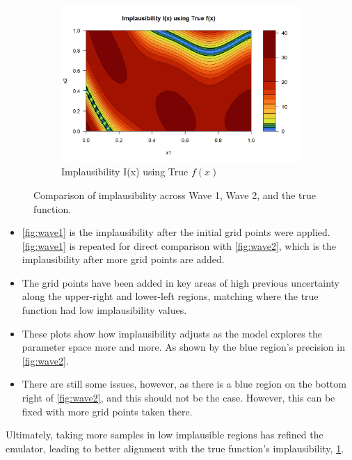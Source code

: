 \documentclass[12pt]{report} %
\begin{document}
\begin{figure}[H]
    \begin{subfigure}{0.6\textwidth}
        \centering
        \includegraphics[width=\linewidth]{Wave Implausibility I(x) using True f(x).png}
        \caption{Implausibility I(x) using True $f(x)$}
        \label{fig:true_implausibility}
    \end{subfigure}
    
    \caption{Comparison of implausibility across Wave 1, Wave 2, and the true function.}
    \label{fig:implausibility_comparison}
\end{figure}

\begin{itemize}
    \item \ref{fig:wave1} is the implausibility after the initial grid points were applied. \ref{fig:wave1} is repeated for direct comparison with \ref{fig:wave2}, which is the implausibility after more grid points are added.
    \item The grid points have been added in key areas of high previous uncertainty along the upper-right and lower-left regions, matching where the true function had low implausibility values.
    \item These plots show how implausibility adjusts as the model explores the parameter space more and more. As shown by the blue region's precision in \ref{fig:wave2}.
    \item There are still some issues, however, as there is a blue region on the bottom right of \ref{fig:wave2}, and this should not be the case. However, this can be fixed with more grid points taken there.
\end{itemize}

\noindent Ultimately, taking more samples in low implausible regions has refined the emulator, leading to better alignment with the true function's implausibility, \ref{fig:true_implausibility}.
\end{document}

